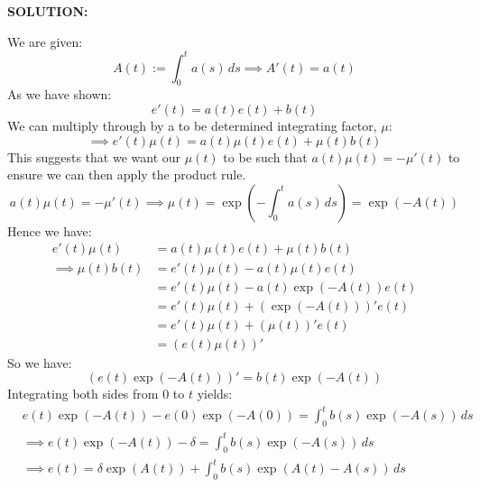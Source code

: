 \documentclass[]{article}
\begin{document}
\noindent\textbf{SOLUTION:}\newline

\noindent We are given:
\[
A(t) := \int_0^t a(s)\,ds \implies A'(t) = a(t)
\]
\noindent As we have shown:
\[
e'(t)=a(t)e(t) + b(t)
\]
\noindent We can multiply through by a to be determined integrating factor, $\mu$:
\[
\implies e'(t)\mu(t)=a(t)\mu(t)e(t)+\mu(t)b(t)
\]
\noindent This suggests that we want our $\mu(t)$ to be such that $a(t)\mu(t) = - \mu'(t)$ to ensure we can then apply the product rule.\newline
\[
a(t)\mu(t) = - \mu'(t) \implies \mu(t) = \exp\left(-\int_0^t a(s)\,ds\right) = \exp(-A(t))
\]
\noindent Hence we have:
\begin{align*}
    e'(t)\mu(t)&=a(t)\mu(t)e(t)+\mu(t)b(t)\\
\implies \mu(t)b(t) &=  e'(t)\mu(t)-a(t)\mu(t)e(t)\\  &=  e'(t)\mu(t)-a(t)\exp(-A(t))e(t)\\
  &=  e'(t)\mu(t) +\left(\exp(-A(t))\right)'e(t)\\
  &=  e'(t)\mu(t) +\left(\mu(t)\right)'e(t)\\
  &= \left(e(t)\mu(t)\right)'
\end{align*}
\noindent So we have:
\[
\left(e(t)\exp(-A(t))\right)' = b(t)\exp(-A(t))
\]
\noindent Integrating both sides from $0$ to $t$ yields:
\begin{align*}
&e(t)\exp(-A(t)) - e(0)\exp(-A(0)) = \int_0^t b(s)\exp(-A(s))\,ds\\
&\implies e(t)\exp(-A(t)) -\delta=\int_0^t b(s)\exp(-A(s))\,ds\\
&\implies e(t) = \delta\exp(A(t)) +\int_0^t b(s)\exp(A(t)-A(s))\,ds
\end{align*}
\end{document}
